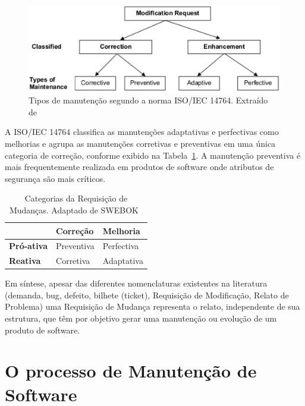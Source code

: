 \begin{figure}[hbtp]
\centering
\includegraphics[width=.75\textwidth]{chapter-intro/img/modification_request.eps}
\caption{Tipos de manutenção segundo a norma ISO/IEC 14764. Extraído de~\cite{1703974}}
\label{fig:modification-request}
\end{figure}

A ISO/IEC 14764 classifica as manutenções adaptativas e perfectivas como melhorias e agrupa as
manutenções corretivas e preventivas em uma única categoria de correção, conforme exibido na
Tabela~\ref{tab:categorias_requisicao_mudanca}. A manutenção preventiva é mais frequentemente
realizada em produtos de software onde atributos de segurança são mais críticos.

\begin{table}[htpb]

	\centering
	\caption{Categorias da Requisição de Mudanças. Adaptado de SWEBOK~\cite{4425813}}\label{tab:categorias_requisicao_mudanca}
	\begin{tabular}{l|l|l|}
		\cline{2-3}
	 & \textbf{Correção} & \textbf{Melhoria} \\ \hline
	 \multicolumn{1}{|l|}{\textbf{Pró-ativa}} & Preventiva & Perfectiva \\ \hline
	 \multicolumn{1}{|l|}{\textbf{Reativa}} & Corretiva & Adaptativa \\ \hline
	\end{tabular}
 \end{table} 

Em síntese, apesar das diferentes nomenclaturas existentes na literatura (demanda, bug, defeito, bilhete (ticket),
Requisição de Modificação, Relato de Problema) uma Requisição de Mudança representa o relato,
independente de sua estrutura, que têm por objetivo gerar uma manutenção ou evolução de um produto
de software. 
 
 \section{O processo de Manutenção de Software}
\label{sec:o_processo_de_manutecao_de_software}

